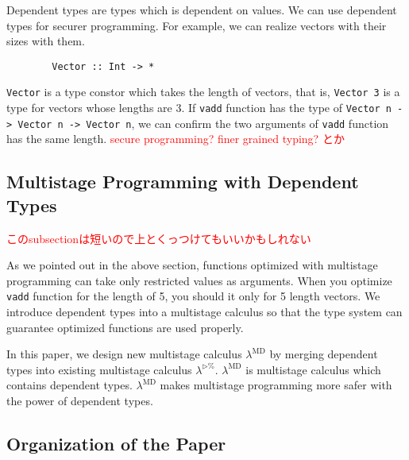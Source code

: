 \documentclass[runningheads]{llncs}
\newcommand{\red}[1]{\textcolor{red}{#1 }}
\newcommand{\LTP}{$\lambda^{\triangleright\%}$\xspace}
\newcommand{\LMD}{$\lambda^{\textrm{MD}}$\xspace}
\begin{document}

Dependent types are types which is dependent on values.
We can use dependent types for securer programming.
For example, we can realize vectors with their sizes with them.
\begin{verbatim}
        Vector :: Int -> *
\end{verbatim}
\verb|Vector| is a type constor which takes the length of vectors, that is, 
\verb|Vector 3| is a type for vectors whose lengths are 3.
If \verb|vadd| function has the type of \verb|Vector n -> Vector n -> Vector n|,
we can confirm the two arguments of \verb|vadd| function has the same length.
\red{secure programming? finer grained typing? とか}

\subsection{Multistage Programming with Dependent Types}
\red{このsubsectionは短いので上とくっつけてもいいかもしれない}


As we pointed out in the above section,
functions optimized with multistage programming can take only restricted values as arguments.
When you optimize \verb|vadd| function for the length of 5, you should it only for 5 length vectors.
We introduce dependent types into a multistage calculus
so that the type system can guarantee optimized functions are used properly.

In this paper, we design new multistage calculus \LMD by 
merging dependent types into existing multistage calculus \LTP\cite{Hanada2014}.
\LMD is multistage calculus which contains dependent types.
\LMD makes multistage programming more safer with the power of dependent types.

\subsection{Organization of the Paper}
\end{document}
